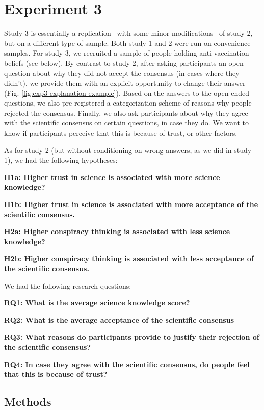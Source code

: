 \documentclass[
  doc,floatsintext]{apa6}
\begin{document}
\section{Experiment 3}\label{experiment-3}

Study 3 is essentially a replication-\/--with some minor modifications-\/--of study 2, but on a different type of sample. Both study 1 and 2 were run on convenience samples. For study 3, we recruited a sample of people holding anti-vaccination beliefs (see below). By contrast to study 2, after asking participants an open question about why they did not accept the consensus (in cases where they didn't), we provide them with an explicit opportunity to change their answer (Fig. \ref{fig:exp3-explanation-example}). Based on the answers to the open-ended questions, we also pre-registered a categorization scheme of reasons why people rejected the consensus. Finally, we also ask participants about why they agree with the scientific consensus on certain questions, in case they do. We want to know if participants perceive that this is because of trust, or other factors.

As for study 2 (but without conditioning on wrong answers, as we did in study 1), we had the following hypotheses:

\textbf{H1a: Higher trust in science is associated with more science knowledge?}

\textbf{H1b: Higher trust in science is associated with more acceptance of the scientific consensus.}

\textbf{H2a: Higher conspiracy thinking is associated with less science knowledge?}

\textbf{H2b: Higher conspiracy thinking is associated with less acceptance of the scientific consensus.}

We had the following research questions:

\textbf{RQ1: What is the average science knowledge score?}

\textbf{RQ2: What is the average acceptance of the scientific consensus}

\textbf{RQ3: What reasons do participants provide to justify their rejection of the scientific consensus?}

\textbf{RQ4: In case they agree with the scientific consensus, do people feel that this is because of trust?}

\subsection{Methods}\label{methods-2}
\end{document}
